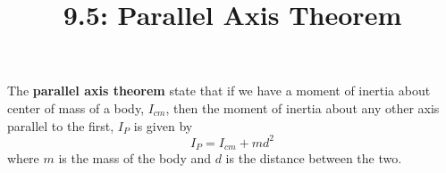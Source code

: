 \documentclass{article}
\title{9.5: Parallel Axis Theorem}
\begin{document}
\maketitle

\begin{definition}
The \textbf{parallel axis theorem} state that if we have a moment of inertia about center of mass of a body, $I_{cm}$, then the moment of inertia about any other axis parallel to the first, $I_P$ is given by $$I_P = I_{cm} + md^2$$where $m$ is the mass of the body and $d$ is the distance between the two. 
\end{definition}
\end{document}
